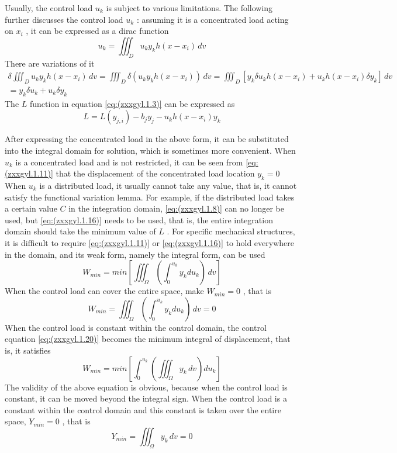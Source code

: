 Usually, the control load $ u_k $ is subject to various limitations. The following further discusses the control load $ u_k $ : assuming it is a concentrated load acting on $ x_i $ , it can be expressed as a dirac function
\begin{equation} \label{eq:(zxxgyl.1.17)}    
u_k = \iiint_D u_ky_k h(x-x_i) \,dv
\end{equation}
There are variations of it
\begin{multline} \label{eq:(zxxgyl.1.18)}    
\delta\iiint_D u_ky_kh(x-x_i)\,dv = \iiint_D\delta( u_k y_k h(x-x_i) )\,dv
=\iiint_D  [y_k \delta u_k h(x-x_i) +u_k h(x-x_i) \delta y_k] \,dv
\\=y_k \delta u_k+u_k \delta y_k
\end{multline}
The $ L$  function in equation \ref{eq:(zxxgyl.1.3)} can be expressed as
\begin{equation}\label{eq:(zxxgyl.1.19)}
L = L(y_{j,i})-b_j y_j-u_kh(x-x_i) y_k
\end{equation}

After expressing the concentrated load in the above form, it can be substituted into the integral domain for solution, which is sometimes more convenient.
When $ u_k $ is a concentrated load and is not restricted, it can be seen from \ref{eq:(zxxgyl.1.11)} that the displacement of the concentrated load location $ y_k=0$ 
When $ u_k $ is a distributed load, it usually cannot take any value, that is, it cannot satisfy the functional variation lemma. For example, if the distributed load takes a certain value $ C $ in the integration domain, \ref{eq:(zxxgyl.1.8)} can no longer be used, but \ref{eq:(zxxgyl.1.16)} needs to be used, that is, the entire integration domain should take the minimum value of $ L$  .
For specific mechanical structures, it is difficult to require \ref{eq:(zxxgyl.1.11)} or \ref{eq:(zxxgyl.1.16)} to hold everywhere in the domain, and its weak form, namely the integral form, can be used
\begin{equation}\label{eq:(zxxgyl.1.20)}
W_{min} = min[\iiint_\Omega (\int_{0}^{u_k} y_k  d u_k)\,dv]
\end{equation}
When the control load can cover the entire space, make $ W_ {min}=0 $ , that is
\begin{equation}\label{eq:(zxxgyl.1.21)}
W_{min} =\iiint_\Omega(\int_{0}^{u_k} y_k  d u_k)\,dv= 0
\end{equation}
When the control load is constant within the control domain, the control equation \ref{eq:(zxxgyl.1.20)} becomes the minimum integral of displacement, that is, it satisfies
\begin{equation}\label{eq:(zxxgyl.1.22)}
W_{min} = min[\int_{0}^{u_k} (\iiint_\Omega y_k  \,dv)d u_k]
\end{equation}
The validity of the above equation is obvious, because when the control load is constant, it can be moved beyond the integral sign.
When the control load is a constant within the control domain and this constant is taken over the entire space, $ Y_{min}=0 $ , that is
\begin{equation}\label{eq:(zxxgyl.1.23)}
Y_{min} =\iiint_\Omega y_k\,dv= 0
\end{equation}

